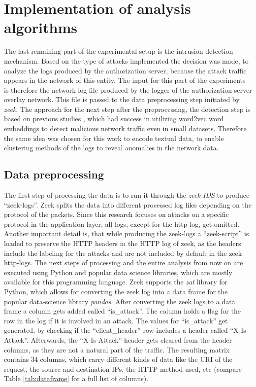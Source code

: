 \documentclass[
    fontsize=12pt,
    headings=small,
    parskip=half,           %
    bibliography=totoc,
    numbers=noenddot,       %
    open=any,               %
    ]{scrreprt}
\begin{document}
\section{Implementation of analysis algorithms}
The last remaining part of the experimental setup is the intrusion detection mechanism. Based on the type of attacks implemented the decision was made, to analyze the logs produced by the authorization server, because the attack traffic appears in the network of this entity. The input for this part of the experiments is therefore the network log file produced by the logger of the authorization server overlay network. This file is passed to the data preprocessing step initiated by \emph{zeek}. The approach for the next step after the preprocessing, the detection step is based on previous studies \cite{carrasco2018unsupervised} \cite{zhuo2017network}, which had success in utilizing word2vec word embeddings to detect malicious network traffic even in small datasets. Therefore the same idea was chosen for this work to encode textual data, to enable clustering methods of the logs to reveal anomalies in the network data.

\subsection{Data preprocessing}The first step of processing the data is to run it through the \emph{zeek IDS} to produce ``zeek-logs''. Zeek splits the data into different processed log files depending on the protocol of the packets. Since this research focuses on attacks on a specific protocol in the application layer, all logs, except for the http-log, get omitted. Another important detail is, that while producing the zeek-logs a ``zeek-script'' is loaded to preserve the HTTP headers in the HTTP log of zeek, as the headers include the labeling for the attacks and are not included by default in the zeek http-logs. The next steps of processing and the entire analysis from now on are executed using Python and popular data science libraries, which are mostly available for this programming language. Zeek supports the \emph{zat} library for Python, which allows for converting the zeek log into a data frame for the popular data-science library \emph{pandas}. After converting the zeek logs to a data frame a column gets added called ``is\_attack''. The column holds a flag for the row in the log if it is involved in an attack. The values for ``is\_attack'' get generated, by checking if the ``client\_header'' row includes a header called ``X-Is-Attack''. Afterwards, the ``X-Is-Attack''-header gets cleared from the header columns, as they are not a natural part of the traffic. The resulting matrix contains 34 columns, which carry different kinds of data like the URI of the request, the source and destination IPs, the HTTP method used, etc (compare Table \ref{tab:dataframe} for a full list of columns).
\end{document}
